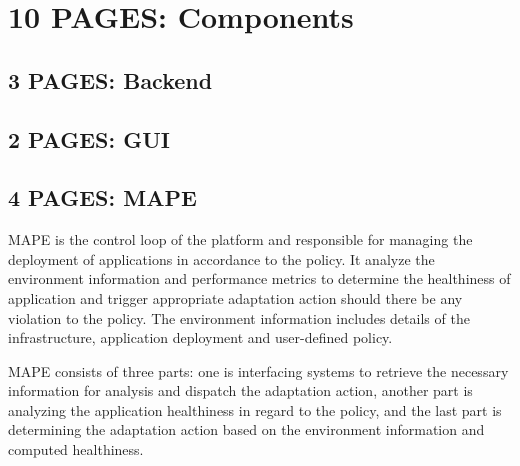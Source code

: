 \documentclass{seal_thesis}
\begin{document}
\chapter{10 PAGES: Components}

\section{3 PAGES: Backend}


\section{2 PAGES: GUI}


\section{4 PAGES: MAPE}

MAPE is the control loop of the platform and responsible for managing the deployment of applications in accordance to the policy.
It analyze the environment information and performance metrics to determine the healthiness of application and trigger appropriate adaptation action should there be any violation to the policy.
The environment information includes details of the infrastructure, application deployment and user-defined policy.

MAPE consists of three parts: one is interfacing systems to retrieve the necessary information for analysis and dispatch the adaptation action, another part is analyzing the application healthiness in regard to the policy, and the last part is determining the adaptation action based on the environment information and computed healthiness.
\end{document}
